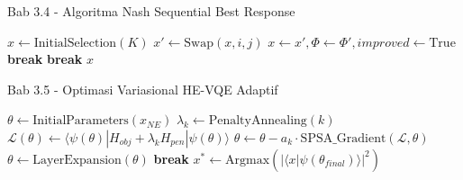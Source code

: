 \begin{frame}[fragile]{Bab 3.4 - Algoritma Nash Sequential Best Response}
    \begin{algorithm}[H]
        \scriptsize
        \begin{algorithmic}[1]
                \State $x \gets \text{InitialSelection}(K)$
                        \State $x' \gets \text{Swap}(x, i, j)$
                            \State $x \gets x', \Phi \gets \Phi', improved \gets \text{True}$
                            \State \textbf{break}
                        \EndIf
                    \EndFor
                     \textbf{break} \EndIf
                \EndFor
                \State \Return $x$ 
            \EndProcedure
        \end{algorithmic}
    \end{algorithm}
\end{frame}

\begin{frame}[fragile]{Bab 3.5 - Optimasi Variasional HE-VQE Adaptif}
    \begin{algorithm}[H]
        \scriptsize
        \begin{algorithmic}[1]
                \State $\theta \gets \text{InitialParameters}(x_{NE})$
                        \State $\lambda_k \gets \text{PenaltyAnnealing}(k)$
                        \State $\mathcal{L}(\theta) \gets \langle \psi(\theta) | H_{obj} + \lambda_k H_{pen} | \psi(\theta) \rangle$
                        \State $\theta \gets \theta - a_k \cdot \text{SPSA\_Gradient}(\mathcal{L}, \theta)$
                    \EndFor
                    \State $\theta \gets \text{LayerExpansion}(\theta)$
                     \textbf{break} \EndIf
                \EndFor
                \State \Return $x^* \gets \text{Argmax}(|\langle x | \psi(\theta_{final}) \rangle|^2)$
            \EndProcedure
        \end{algorithmic}
    \end{algorithm}
\end{frame}

